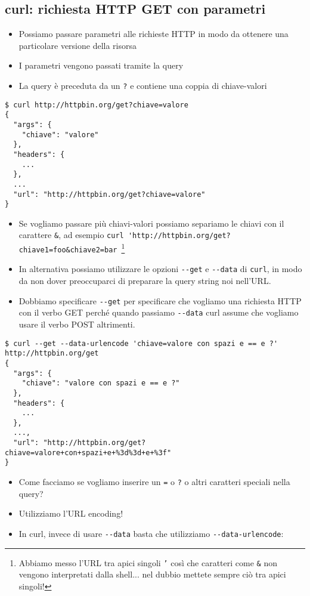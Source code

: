 \documentclass{beamer}
\newcommand{\code}[1]{\mbox{\texttt{#1}}}
\newcommand{\command}[1]{\mbox{\texttt{#1}}}
\begin{document}
\subsection*{curl: richiesta HTTP GET con parametri}
\begin{frame}{\insertsection}{\insertsubsection}
\begin{itemize}
\item Possiamo passare parametri alle richieste HTTP in modo da ottenere una
particolare versione della risorsa
\item I parametri vengono passati tramite la \alert{query}
\item La query è preceduta da un \code{?} e contiene una coppia di
chiave-valori
\end{itemize}
{\tiny
\begin{verbatim}
$ curl http://httpbin.org/get?chiave=valore
{
  "args": {
    "chiave": "valore"
  },
  "headers": {
    ...
  },
  ...
  "url": "http://httpbin.org/get?chiave=valore"
}
\end{verbatim}
}
\begin{itemize}
\item Se vogliamo passare più chiavi-valori possiamo separiamo le chiavi con il
carattere \code{\&}, ad esempio
\small{\verb|curl 'http://httpbin.org/get?chiave1=foo&chiave2=bar|}~\footnote{Abbiamo
messo l'URL tra apici singoli \code{'} così che caratteri come
\code{\&} non vengono interpretati dalla shell... nel dubbio
mettete sempre ciò tra apici singoli!}
\item In alternativa possiamo utilizzare le opzioni \verb|--get| e \verb|--data|
di \command{curl}, in modo da non dover preoccuparci di preparare la query
string noi nell'URL.
\item Dobbiamo specificare \verb|--get| per specificare che vogliamo una
richiesta HTTP con il verbo GET perché quando passiamo \verb|--data|
curl assume che vogliamo usare il verbo POST altrimenti.
\end{itemize}
{\tiny
\begin{verbatim}
$ curl --get --data-urlencode 'chiave=valore con spazi e == e ?' http://httpbin.org/get
{
  "args": {
    "chiave": "valore con spazi e == e ?"
  },
  "headers": {
    ...
  },
  ...,
  "url": "http://httpbin.org/get?chiave=valore+con+spazi+e+%3d%3d+e+%3f"
}
\end{verbatim}
}
\begin{itemize}
\item Come facciamo se vogliamo inserire un \code{=} o \code{?} o altri
caratteri speciali nella query?
\item Utilizziamo l'\alert{URL encoding}!
\item In curl, invece di usare \verb|--data| basta che utilizziamo
\verb|--data-urlencode|:
\end{itemize}
\end{frame}
\end{document}
